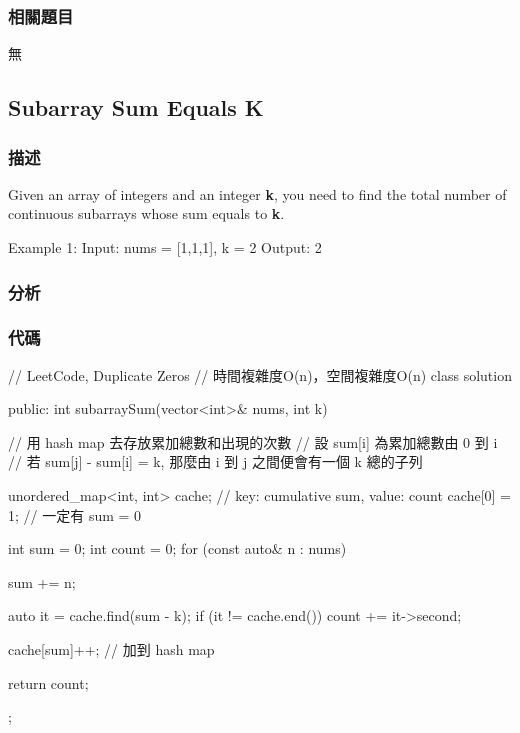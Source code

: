 \subsubsection{相關題目}
\begindot
\item 無
\myenddot

\subsection{Subarray Sum Equals K}
\label{sec:subarray-sum-equals-k}


\subsubsection{描述}
Given an array of integers and an integer \textbf{k}, you need to find the total number of continuous subarrays whose sum equals to \textbf{k}.

\begin{Code}
  Example 1:
  Input: nums = [1,1,1], k = 2
  Output: 2
\end{Code}

\subsubsection{分析}

\subsubsection{代碼}
\begin{Code}
// LeetCode, Duplicate Zeros
// 時間複雜度O(n)，空間複雜度O(n)
class solution{
public:
    int subarraySum(vector<int>& nums, int k) {
        // 用 hash map 去存放累加總數和出現的次數
        // 設 sum[i] 為累加總數由 0 到 i
        // 若 sum[j] - sum[i] = k, 那麼由 i 到 j 之間便會有一個 k 總的子列

        unordered_map<int, int> cache; // key: cumulative sum, value: count
        cache[0] = 1; // 一定有 sum = 0

        int sum = 0;
        int count = 0;
        for (const auto& n : nums)
        {
            sum += n;

            auto it = cache.find(sum - k);
            if (it != cache.end())
                count += it->second;

            cache[sum]++; // 加到 hash map
        }

        return count;
    }
};
\end{Code}

